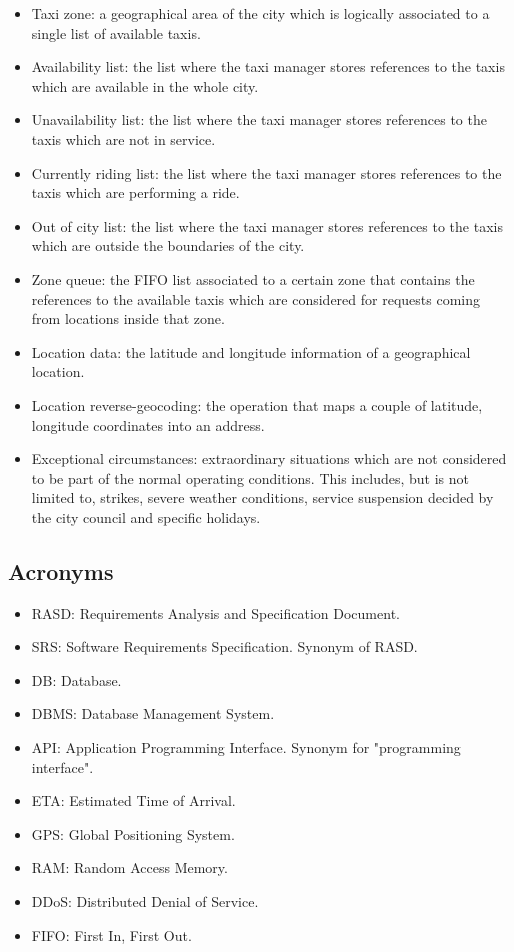 \begin{itemize}
\item Taxi zone: a geographical area of the city which is logically associated to a single list of available taxis. 
\item Availability list: the list where the taxi manager stores references to the taxis which are available in the whole city.
\item Unavailability list: the list where the taxi manager stores references to the taxis which are not in service.
\item Currently riding list: the list where the taxi manager stores references to the taxis which are performing a ride.
\item Out of city list: the list where the taxi manager stores references to the taxis which are outside the boundaries of the city. 
\item Zone queue: the FIFO list associated to a certain zone that contains the references to the available taxis which are considered for requests coming from locations inside that zone. 
\item Location data: the latitude and longitude information of a geographical location.
\item Location reverse-geocoding: the operation that maps a couple of latitude, longitude coordinates into an address. 
\item Exceptional circumstances: extraordinary situations which are not considered to be part of the normal operating conditions. This includes, but is not limited to, strikes, severe weather conditions, service suspension decided by the city council and specific holidays.
\end{itemize}


\subsection{Acronyms}
\begin{itemize}
\item RASD: Requirements Analysis and Specification Document.
\item SRS: Software Requirements Specification. Synonym of RASD.
\item DB: Database.
\item DBMS: Database Management System.
\item API: Application Programming Interface. Synonym for "programming interface".
\item ETA: Estimated Time of Arrival.
\item GPS: Global Positioning System.
\item RAM: Random Access Memory.
\item DDoS: Distributed Denial of Service.
\item FIFO: First In, First Out.
\end{itemize}


